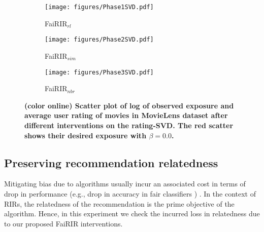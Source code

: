 \begin{figure}[tb]
	\centering
	\begin{subfigure}{0.32\columnwidth}
		\centering
		\texttt{[image: figures/Phase1SVD.pdf]}
		\caption{FaiRIR$_{rl}$}
		\label{fig: Phase1Exp}
	\end{subfigure}%
	\begin{subfigure}{0.32\columnwidth}
		\centering
		\texttt{[image: figures/Phase2SVD.pdf]}
		\caption{FaiRIR$_{sim}$}
		\label{fig: Phase2Exp}
	\end{subfigure}
	\begin{subfigure}{0.32\columnwidth}
		\centering
		\texttt{[image: figures/Phase3SVD.pdf]}
		\caption{FaiRIR$_{nbr}$}
		\label{fig: Phase3Exp}
	\end{subfigure}
	\vspace*{-2 mm}
	\caption{{\bf (color online) Scatter plot of log of observed exposure and average user rating of movies in MovieLens dataset after different interventions on the rating-SVD. The red scatter shows their desired exposure with $\beta = 0.0$.} %
	}
	\label{fig: FairExp}
	\vspace*{-3 mm}
\end{figure}



\subsection{Preserving recommendation relatedness} \label{sub:expt-reco-relatedness}

Mitigating bias due to algorithms usually
incur an associated cost in terms of drop in performance (e.g., drop in accuracy in fair classifiers 
\cite{zafar2017fairness})
. 
In the context of RIRs, the relatedness of the recommendation is the prime objective of the algorithm. 
Hence, in this experiment we check the incurred loss in relatedness due to our proposed FaiRIR interventions.


